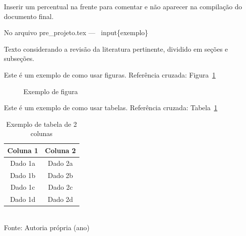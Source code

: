 

Inserir um percentual na frente para comentar e não aparecer na compilação do documento final. 

No arquivo pre\_projeto.tex --- \ input\{exemplo\}

Texto considerando a revisão da literatura pertinente, dividido em seções e subseções.

Este é um exemplo de como usar figuras. Referência cruzada: Figura~\ref{fig:exemplo}



\begin{figure}[!htbp]
	\centering
	\caption{Exemplo de figura}
	\label{fig:exemplo}
\end{figure}


Este é um exemplo de como usar tabelas. Referência cruzada: Tabela~\ref{tab:exemplo}

\begin{table}[!htbp]
\centering
\caption{Exemplo de tabela de 2 colunas}
	\begin{tabular}{ c | c }
		\hline
		\textbf{Coluna 1} & \textbf{Coluna 2} \\ \hline
		Dado 1a           & Dado 2a           \\ \hline
		Dado 1b           & Dado 2b           \\ \hline
		Dado 1c           & Dado 2c           \\ \hline
		Dado 1d           & Dado 2d           \\ \hline
	\end{tabular}
	\\ \vspace{0.2cm}
	Fonte: Autoria própria (ano)
	\label{tab:exemplo}
\end{table}


